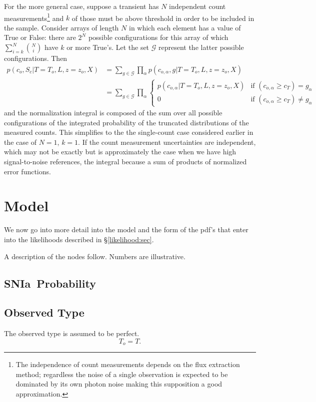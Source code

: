 \documentclass[preprint,3p]{elsarticle}
\begin{document}
For the more general case, suppose a transient has $N$ independent count measurements\footnote{The independence of count measurements  depends on the flux extraction method; regardless the
noise of a single observation is expected to be dominated by its own photon noise making this
supposition a good approximation.} and $k$ of those must be above threshold in order to be
included in the sample.
Consider arrays of length $N$ in which each element has a value of True or False: there are $2^N$ possible configurations for this array
of which $\sum_{i=k}^N {N \choose i}$ have $k$ or more True's.  Let the set $\mathcal{G}$ represent the latter possible configurations.
Then
\begin{align}
p(c_o, S_c| T=T_o, L, z=z_o, X) &= \sum_{g \in \mathcal{G}} \prod_{\alpha} p(c_{o, \alpha}, g | T=T_o, L, z=z_o, X)\\
 &=  \sum_{g \in \mathcal{G}}  \prod_{\alpha} \begin{cases}
   p(c_{o,\alpha} | T=T_o, L, z=z_o, X) & \text{if } (c_{o,\alpha} \ge c_T) = g_\alpha\\
   0 & \text{if }  (c_{o,\alpha} \ge c_T)  \ne g_\alpha
 \end{cases}
\end{align}
and the normalization integral is composed of the sum over all possible configurations of the integrated probability of the truncated distributions
of the measured counts.  This simplifies to the the single-count case considered earlier in the case of $N=1$, $k=1$.
If the count measurement uncertainties are independent, which may not be exactly but is approximately the case when we have high
signal-to-noise references, the integral because a sum of products of normalized error functions.



\section{Model}
\label{model:sec}

We now go into more detail into the model and the form of the pdf's that enter
into the likelihoods described in \S\ref{likelihood:sec}.

A description of the nodes follow.  Numbers are illustrative. 


\subsection{SNIa~Probability}
\subsection{Observed Type}
The observed type is assumed to be perfect.
\begin{equation}
T_o = T.
\end{equation}
\end{document}
